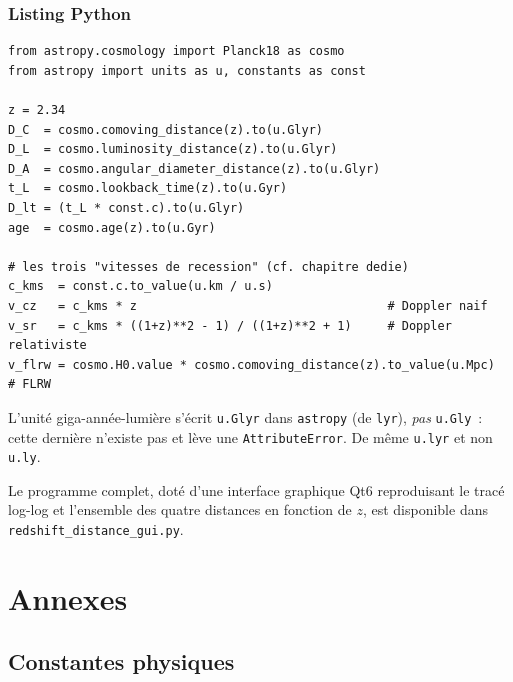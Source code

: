 \documentclass[11pt,a4paper,openany]{report}
\begin{document}
\section{Listing Python}

\begin{verbatim}
from astropy.cosmology import Planck18 as cosmo
from astropy import units as u, constants as const

z = 2.34
D_C  = cosmo.comoving_distance(z).to(u.Glyr)
D_L  = cosmo.luminosity_distance(z).to(u.Glyr)
D_A  = cosmo.angular_diameter_distance(z).to(u.Glyr)
t_L  = cosmo.lookback_time(z).to(u.Gyr)
D_lt = (t_L * const.c).to(u.Glyr)
age  = cosmo.age(z).to(u.Gyr)

# les trois "vitesses de recession" (cf. chapitre dedie)
c_kms  = const.c.to_value(u.km / u.s)
v_cz   = c_kms * z                                   # Doppler naif
v_sr   = c_kms * ((1+z)**2 - 1) / ((1+z)**2 + 1)     # Doppler relativiste
v_flrw = cosmo.H0.value * cosmo.comoving_distance(z).to_value(u.Mpc)   # FLRW
\end{verbatim}

\begin{tcolorbox}[attention]
L'unité giga-année-lumière s'écrit \texttt{u.Glyr} dans \texttt{astropy}
(de \texttt{lyr}), \emph{pas} \texttt{u.Gly}~: cette dernière n'existe pas et
lève une \texttt{AttributeError}. De même \texttt{u.lyr} et non \texttt{u.ly}.
\end{tcolorbox}

\noindent Le programme complet, doté d'une interface graphique Qt6
reproduisant le tracé log-log et l'ensemble des quatre distances en fonction
de $z$, est disponible dans \texttt{redshift\_distance\_gui.py}.

\clearpage

\part{Annexes}

\appendix

\chapter{Constantes physiques}
\end{document}
